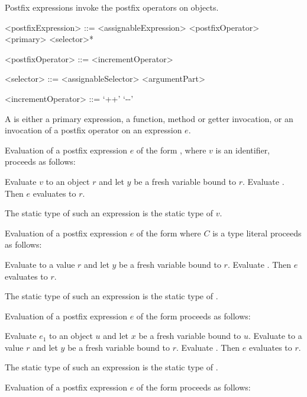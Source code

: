 \documentclass[makeidx]{article}
\begin{document}
\LMHash{}%
Postfix expressions invoke the postfix operators on objects.

\begin{grammar}
<postfixExpression> ::= <assignableExpression> <postfixOperator>
  \alt <primary> <selector>*

<postfixOperator> ::= <incrementOperator>

<selector> ::= <assignableSelector>
  \alt <argumentPart>

<incrementOperator> ::= `++'
  \alt `-\mbox-'
\end{grammar}

\LMHash{}%
A  is either a primary expression, a function, method or getter invocation, or an invocation of a postfix operator on an expression $e$.

\LMHash{}%
Evaluation of a postfix expression $e$ of the form , where $v$ is an identifier, proceeds as follows:

\LMHash{}%
Evaluate $v$ to an object $r$ and let $y$ be a fresh variable bound to $r$.
Evaluate .
Then $e$ evaluates to $r$.

\LMHash{}%
The static type of such an expression is the static type of $v$.


\LMHash{}%
Evaluation of a postfix expression $e$ of the form 
where $C$ is a type literal proceeds as follows:

\LMHash{}%
Evaluate  to a value $r$
and let $y$ be a fresh variable bound to $r$.
Evaluate .
Then $e$ evaluates to $r$.

\LMHash{}%
The static type of such an expression is the static type of .

\LMHash{}%
Evaluation of a postfix expression $e$ of the form 
proceeds as follows:

\LMHash{}%
Evaluate $e_1$ to an object $u$ and let $x$ be a fresh variable bound to $u$.
Evaluate  to a value $r$
and let $y$ be a fresh variable bound to $r$.
Evaluate .
Then $e$ evaluates to $r$.

\LMHash{}%
The static type of such an expression is the static type of .

\LMHash{}%
Evaluation of a postfix expression $e$ of the form 
proceeds as follows:
\end{document}
